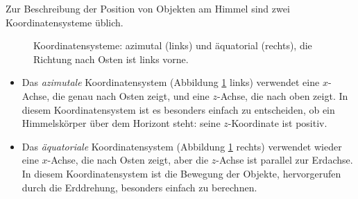Zur Beschreibung der Position von Objekten am Himmel sind zwei
Koordinatensysteme üblich.
\begin{figure}[ht]
\begin{center}
\quad
\quad
{}
\end{center}
\caption{Koordinatensysteme: azimutal (links) und äquatorial (rechts),
die Richtung nach Osten ist links vorne.
\label{40000007:coord}}
\end{figure}
\begin{itemize}
\item
Das {\it azimutale} Koordinatensystem
(Abbildung \ref{40000007:coord} links)
verwendet eine $x$-Achse, die genau nach Osten zeigt, und eine $z$-Achse,
die nach oben zeigt.
In diesem Koordinatensystem ist es besonders einfach zu entscheiden, ob
ein Himmelskörper über dem Horizont steht: seine $z$-Koordinate ist
positiv.
\item
Das {\it äquatoriale} Koordinatensystem
(Abbildung \ref{40000007:coord} rechts)
verwendet wieder eine $x$-Achse,
die nach Osten zeigt, aber die $z$-Achse ist parallel zur Erdachse.
In diesem Koordinatensystem ist die Bewegung der Objekte, hervorgerufen
durch die Erddrehung, besonders einfach zu berechnen.
\end{itemize}
